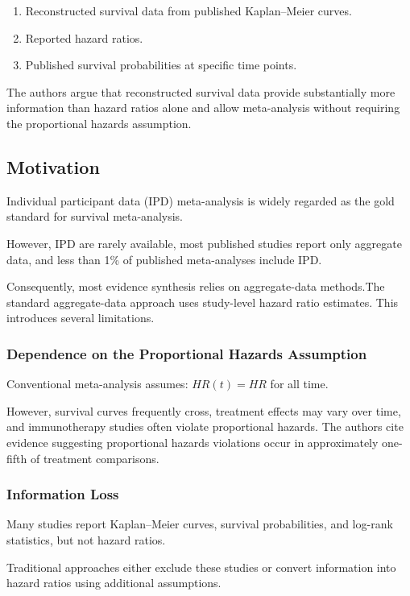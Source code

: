 \documentclass[11pt]{article}
\begin{document}
\begin{enumerate}
    \item Reconstructed survival data from published Kaplan--Meier curves.
    \item Reported hazard ratios.
    \item Published survival probabilities at specific time points.
\end{enumerate}

The authors argue that reconstructed survival data provide substantially more information than hazard ratios alone and allow meta-analysis without requiring the proportional hazards assumption.

\subsection*{Motivation}

Individual participant data (IPD) meta-analysis is widely regarded as the gold standard for survival meta-analysis.

However, IPD are rarely available, most published studies report only aggregate data, and less than 1\% of published meta-analyses include IPD.

Consequently, most evidence synthesis relies on aggregate-data methods.The standard aggregate-data approach uses study-level hazard ratio estimates. This introduces several limitations.

\subsubsection*{Dependence on the Proportional Hazards Assumption}

Conventional meta-analysis assumes: $HR(t)=HR$ for all time.

However, survival curves frequently cross, treatment effects may vary over time, and immunotherapy studies often violate proportional hazards. The authors cite evidence suggesting proportional hazards violations occur in approximately one-fifth of treatment comparisons.

\subsubsection*{Information Loss}

Many studies report Kaplan--Meier curves, survival probabilities, and log-rank statistics, but not hazard ratios.

Traditional approaches either exclude these studies or convert information into hazard ratios using additional assumptions.
\end{document}
